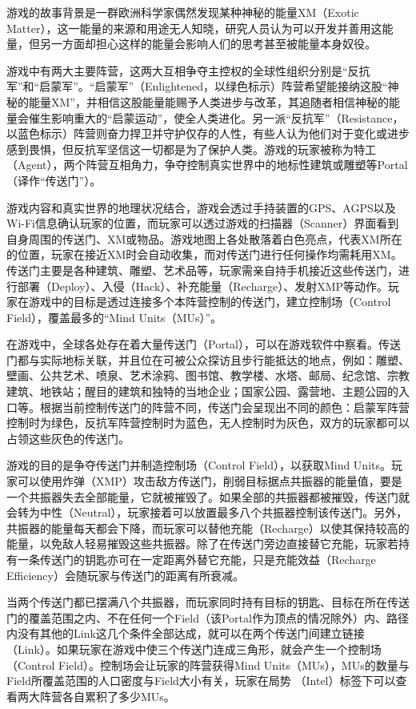 \documentclass[UTF8]{ctexart}
\begin{document}
\begin{tcolorbox}[breakable]
    游戏的故事背景是一群欧洲科学家偶然发现某种神秘的能量XM（Exotic Matter），这一能量的来源和用途无人知晓，研究人员认为可以开发并善用这能量，但另一方面却担心这样的能量会影响人们的思考甚至被能量本身奴役。

    游戏中有两大主要阵营，这两大互相争夺主控权的全球性组织分别是“反抗军”和“启蒙军”。“启蒙军”（Enlightened，以绿色标示）阵营希望能接纳这股“神秘的能量XM”，并相信这股能量能赐予人类进步与改革，其追随者相信神秘的能量会催生影响重大的“启蒙运动”，使全人类进化。另一派“反抗军”（Resistance，以蓝色标示）阵营则奋力捍卫并守护仅存的人性，有些人认为他们对于变化或进步感到畏惧，但反抗军坚信这一切都是为了保护人类。游戏的玩家被称为特工（Agent），两个阵营互相角力，争夺控制真实世界中的地标性建筑或雕塑等Portal（译作“传送门”）。

    游戏内容和真实世界的地理状况结合，游戏会透过手持装置的GPS、AGPS以及Wi-Fi信息确认玩家的位置，而玩家可以透过游戏的扫描器（Scanner）界面看到自身周围的传送门、XM或物品。游戏地图上各处散落着白色亮点，代表XM所在的位置，玩家在接近XM时会自动收集，而对传送门进行任何操作均需耗用XM。传送门主要是各种建筑、雕塑、艺术品等，玩家需亲自持手机接近这些传送门，进行部署（Deploy）、入侵（Hack）、补充能量（Recharge）、发射XMP等动作。玩家在游戏中的目标是透过连接多个本阵营控制的传送门，建立控制场（Control Field），覆盖最多的“Mind Units（MUs）”。

    在游戏中，全球各处存在着大量传送门（Portal），可以在游戏软件中察看。传送门都与实际地标关联，并且位在可被公众探访且步行能抵达的地点，例如：雕塑、壁画、公共艺术、喷泉、艺术涂鸦、图书馆、教学楼、水塔、邮局、纪念馆、宗教建筑、地铁站；醒目的建筑和独特的当地企业；国家公园、露营地、主题公园的入口等。根据当前控制传送门的阵营不同，传送门会呈现出不同的颜色：启蒙军阵营控制时为绿色，反抗军阵营控制时为蓝色，无人控制时为灰色，双方的玩家都可以占领这些灰色的传送门。

    游戏的目的是争夺传送门并制造控制场（Control Field），以获取Mind Units。玩家可以使用炸弹（XMP）攻击敌方传送门，削弱目标据点共振器的能量值，要是一个共振器失去全部能量，它就被摧毁了。如果全部的共振器都被摧毁，传送门就会转为中性（Neutral），玩家接着可以放置最多八个共振器控制该传送门。另外，共振器的能量每天都会下降，而玩家可以替他充能（Recharge）以使其保持较高的能量，以免敌人轻易摧毁这些共振器。除了在传送门旁边直接替它充能，玩家若持有一条传送门的钥匙亦可在一定距离外替它充能，只是充能效益（Recharge Efficiency）会随玩家与传送门的距离有所衰减。

    当两个传送门都已摆满八个共振器，而玩家同时持有目标的钥匙、目标在所在传送门的覆盖范围之内、不在任何一个Field（该Portal作为顶点的情况除外）内、路径内没有其他的Link这几个条件全部达成，就可以在两个传送门间建立链接（Link）。如果玩家在游戏中使三个传送门连成三角形，就会产生一个控制场（Control Field）。控制场会让玩家的阵营获得Mind Units（MUs），MUs的数量与Field所覆盖范围的人口密度与Field大小有关，玩家在局势 （Intel）标签下可以查看两大阵营各自累积了多少MUs。


\end{tcolorbox}
\end{document}
